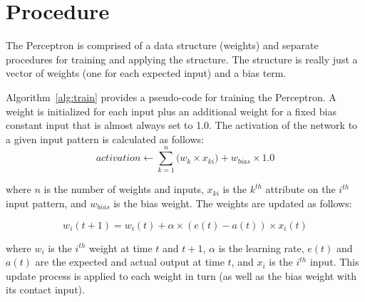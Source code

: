 \documentclass[a4paper, 11pt]{article}
\begin{document}
\section{Procedure}
\label{sec:procedure}
The Perceptron is comprised of a data structure (weights) and separate procedures for training and applying the structure. The structure is really just a vector of weights (one for each expected input) and a bias term.

Algorithm~\ref{alg:train} provides a pseudo-code for training the Perceptron. A weight is initialized for each input plus an additional weight for a fixed bias constant input that is almost always set to 1.0. The activation of the network to a given input pattern is calculated as follows:
\begin{equation}
	activation \leftarrow \sum_{k=1}^{n}\big( w_{k} \times x_{ki}\big) + w_{bias} \times 1.0
\end{equation}

where $n$ is the number of weights and inputs, $x_{ki}$ is the $k^{th}$ attribute on the $i^{th}$ input pattern, and $w_{bias}$ is the bias weight. The weights are updated as follows:

\begin{equation}
	w_{i}(t+1) = w_{i}(t) + \alpha \times (e(t)-a(t)) \times x_{i}(t)
\end{equation}

where $w_i$ is the $i^{th}$ weight at time $t$ and $t+1$, $\alpha$ is the learning rate, $e(t)$ and $a(t)$ are the expected and actual output at time $t$, and $x_i$ is the $i^{th}$ input. This update process is applied to each weight in turn (as well as the bias weight with its contact input).
\end{document}

